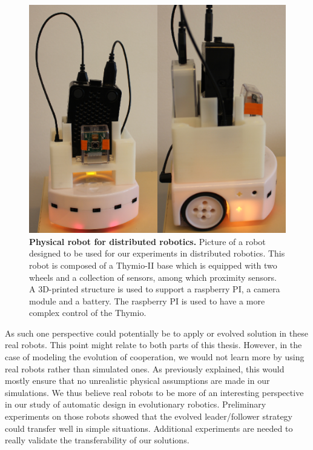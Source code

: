 	    \begin{figure}[hbt]
	        \begin{center}
	          \includegraphics[scale = 0.70]{fig/Discussion/Robot.png}
	          \caption{\textbf{Physical robot for distributed robotics.}
	          Picture of a robot designed to be used for our experiments in distributed robotics. This robot is composed of a Thymio-II base which is equipped with two wheels and a collection of sensors, among which proximity sensors. A 3D-printed structure is used to support a raspberry PI, a camera module and a battery. The raspberry PI is used to have a more complex control of the Thymio.} 
	          \label{fig:thymioPicture}
	        \end{center}
	    \end{figure}

			As such one perspective could potentially be to apply or evolved solution in these real robots. This point might relate to both parts of this thesis. However, in the case of modeling the evolution of cooperation, we would not learn more by using real robots rather than simulated ones. As previously explained, this would mostly ensure that no unrealistic physical assumptions are made in our simulations. We thus believe real robots to be more of an interesting perspective in our study of automatic design in evolutionary robotics. Preliminary experiments on those robots showed that the evolved leader/follower strategy could transfer well in simple situations. Additional experiments are needed to really validate the transferability of our solutions.

